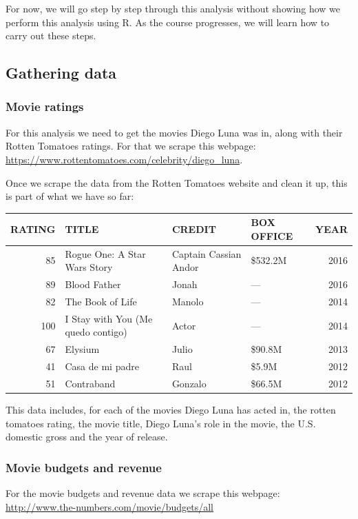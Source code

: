 \documentclass[]{article}
\theoremstyle{definition}
\theoremstyle{definition}
\theoremstyle{remark}
\begin{document}
For now, we will go step by step through this analysis without showing
how we perform this analysis using R. As the course progresses, we will
learn how to carry out these steps.

\subsection{Gathering data}\label{gathering-data}

\subsubsection{Movie ratings}\label{movie-ratings}

For this analysis we need to get the movies Diego Luna was in, along
with their Rotten Tomatoes ratings. For that we scrape this webpage:
\url{https://www.rottentomatoes.com/celebrity/diego_luna}.

Once we scrape the data from the Rotten Tomatoes website and clean it
up, this is part of what we have so far:

\begin{tabular}{r|l|l|l|r}
\hline
RATING & TITLE & CREDIT & BOX OFFICE & YEAR\\
\hline
85 & Rogue One: A Star Wars Story & Captain Cassian Andor & \$532.2M & 2016\\
\hline
89 & Blood Father & Jonah & — & 2016\\
\hline
82 & The Book of Life & Manolo & — & 2014\\
\hline
100 & I Stay with You (Me quedo contigo) & Actor & — & 2014\\
\hline
67 & Elysium & Julio & \$90.8M & 2013\\
\hline
41 & Casa de mi padre & Raul & \$5.9M & 2012\\
\hline
51 & Contraband & Gonzalo & \$66.5M & 2012\\
\hline
\end{tabular}

This data includes, for each of the movies Diego Luna has acted in, the
rotten tomatoes rating, the movie title, Diego Luna's role in the movie,
the U.S. domestic gross and the year of release.

\subsubsection{Movie budgets and
revenue}\label{movie-budgets-and-revenue}

For the movie budgets and revenue data we scrape this webpage:
\url{http://www.the-numbers.com/movie/budgets/all}
\end{document}
